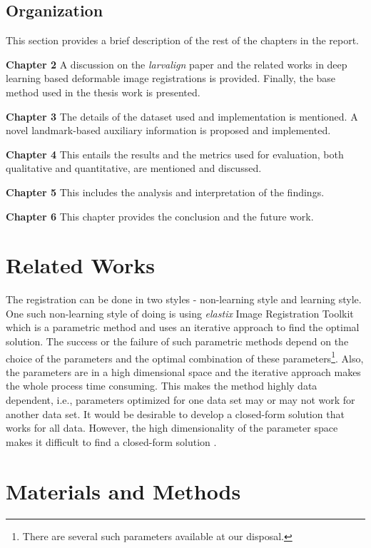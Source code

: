 \documentclass{article}
\begin{document}
	\subsection{Organization}
	This section provides a brief description of the rest of the chapters in the report.
	
	\textbf{Chapter 2} A discussion on the \emph{larvalign} paper and the related works in deep learning based deformable image registrations is provided. Finally, the base method used in the thesis work is presented. 
	
	\textbf{Chapter 3} The details of the dataset used and implementation is mentioned. A novel landmark-based auxiliary information is proposed and implemented.
	
	\textbf{Chapter 4} This entails the results and the metrics used for evaluation, both qualitative and quantitative, are mentioned and discussed.
	
	\textbf{Chapter 5} This includes the analysis and interpretation of the findings.
	
	\textbf{Chapter 6} This chapter provides the conclusion and the future work.
	
	\section{Related Works}
	
	The registration can be done in two styles - non-learning style and learning style.	One such non-learning style of doing is using \emph{elastix} Image Registration Toolkit which is a parametric method and uses an iterative approach to find the optimal solution. The success or the failure of such parametric methods depend on the choice of the parameters and the optimal combination of these parameters\footnote{There are several such parameters available at our disposal.}. Also, the parameters are in a high dimensional space and the iterative approach makes the whole process time consuming. This makes the method highly data dependent, i.e., parameters optimized for one data set may or may not work for another data set. It would be desirable to develop a closed-form solution that works for all data. However, the high dimensionality of the parameter space makes it difficult to find a closed-form solution \cite{Fu_2020}. \newline
	
	
	\section{Materials and Methods}
	
\end{document}
